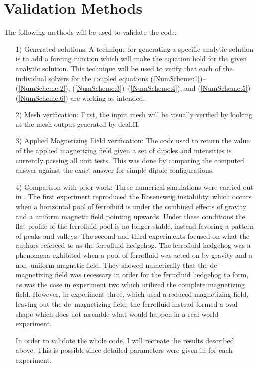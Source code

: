 \documentclass[11pt,fullpage]{article}
\theoremstyle{lemma}
\theoremstyle{definition}
\theoremstyle{lemma}
\begin{document}
\section{Validation Methods}
The following methods will be used to validate the code:
\begin{itemize}
	\item[1)] Generated solutions: A technique for generating a specific analytic solution is to add a forcing function which will make the equation hold for the given analytic solution. This technique will be used to verify that each of the individual solvers for the coupled equations (\ref{NumScheme:1})--(\ref{NumScheme:2}), (\ref{NumScheme:3})--(\ref{NumScheme:4}), and (\ref{NumScheme:5})--(\ref{NumScheme:6}) are working as intended.
	
	\item[2)] Mesh verification: First, the input mesh will be visually verified by looking at the mesh output generated by deal.II.
	
	\item[3)] Applied Magnetizing Field verification: The code used to return the value of the applied magnetizing field given a set of dipoles and intensities is currently passing all unit tests. This was done by comparing the computed answer against the exact answer for simple dipole configurations.
	
	\item[4)] Comparison with prior work: Three numerical simulations were carried out in \cite{DiffuseInterface}. The first experiment reproduced the Rosensweig instability, which occurs when a horizontal pool of ferrofluid is under the combined effects of gravity and a uniform magnetic field pointing upwards. Under these conditions the flat profile of the ferrofluid pool is no longer stable, instead favoring a pattern of peaks and valleys. The second and third experiments focused on what the authors refereed to as the ferrofluid hedgehog. The ferrofluid hedgehog was a phenomena exhibited when a pool of ferrofluid was acted on by gravity and a non--uniform magnetic field. They showed numerically that the de--magnetizing field was necessary in order for the ferrofluid hedgehog to form, as was the case in experiment two which utilized the complete magnetizing field. However, in experiment three, which used a reduced magnetizing field, leaving out the de--magnetizing field, the ferrofluid instead formed a oval shape which does not resemble what would happen in a real world experiment.
	
	In order to validate the whole code, I will recreate the results described above. This is possible since detailed parameters were given in \cite{DiffuseInterface} for each experiment.
\end{itemize}
\end{document}
